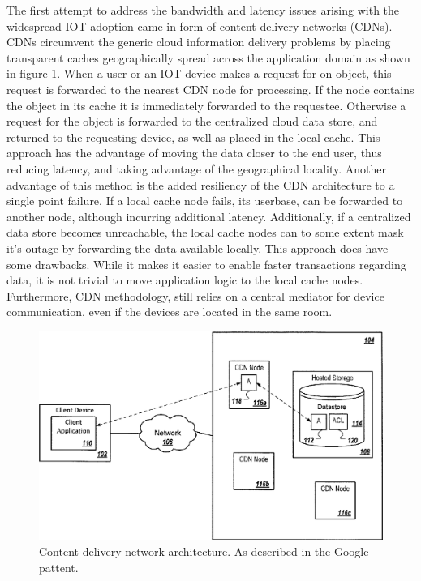 The first attempt to address the bandwidth and latency issues arising with the widespread IOT adoption came in form of content delivery networks (CDNs).\cite{gagliardi2011content} CDNs circumvent the generic cloud information delivery problems by placing transparent caches geographically spread across the application domain as shown in figure \ref{lit:fig:2}.
When a user or an IOT device makes a request for on object, this request is forwarded to the nearest CDN node for processing.
If the node contains the object in its cache it is immediately forwarded to the requestee.
Otherwise a request for the object is forwarded to the centralized cloud data store, and returned to the requesting device, as well as placed in the local cache.
This approach has the advantage of moving the data closer to the end user, thus reducing latency, and taking advantage of the geographical locality.
Another advantage of this method is the added resiliency of the CDN architecture to a single point failure.
If a local cache node fails, its userbase, can be forwarded to another node, although incurring additional latency.
Additionally, if a centralized data store becomes unreachable, the local cache nodes can to some extent mask it's outage by forwarding the data available locally.
This approach does have some drawbacks.
While it makes it easier to enable faster transactions regarding data, it is not trivial to move application logic to the local cache nodes.
Furthermore, CDN methodology, still relies on a central mediator for device communication, even if the devices are located in the same room.

\begin{figure}[h]
    \centering
    \includegraphics[width=0.6\linewidth]{img/cdn.png}
    \caption{Content delivery network architecture.
    As described in the Google pattent.\cite{gagliardi2011content}}
    \label{lit:fig:2}
\end{figure}

